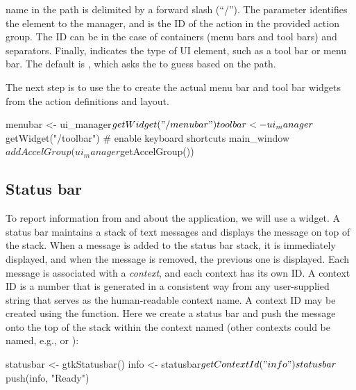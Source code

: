 \documentclass[article,shortnames]{jss}
\begin{document}
name in the path is delimited by a forward slash (``/''). The
 parameter identifies the element to the manager, and
 is the ID of the action in the provided action group.
The ID can be  in the case of containers (menu bars and
tool bars) and separators. Finally,  indicates the type of
UI element, such as a tool bar or menu bar. The default is
, which asks the  to guess based on the
path.

The next step is to use the  to create the actual
menu bar and tool bar widgets from the action definitions and layout.
\begin{Code}
menubar <- ui_manager$getWidget("/menubar")
toolbar <- ui_manager$getWidget("/toolbar")
    # enable keyboard shortcuts 
main_window$addAccelGroup(ui_manager$getAccelGroup()) 
\end{Code}

\subsection{Status bar}

To report information from and about the application, we will use a
 widget.  A status bar maintains a 
stack of text messages and displays the message on top of the
stack. When a message is added to the status bar stack, it is
immediately displayed, and when the message is removed, the previous
one is displayed.
Each message is associated with a \emph{context}, and each context has
its own ID. A context ID is a number that is generated in a consistent
way from any user-supplied string that serves as the human-readable
context name.  A context ID may be created using the
 function.
Here we create a status bar and push the message  onto
the top of the stack within the context named  (other
contexts could be named, e.g.,
 or ):
\begin{Code}
statusbar <- gtkStatusbar()
info <- statusbar$getContextId("info")
statusbar$push(info, "Ready") 
\end{Code}
\end{document}
